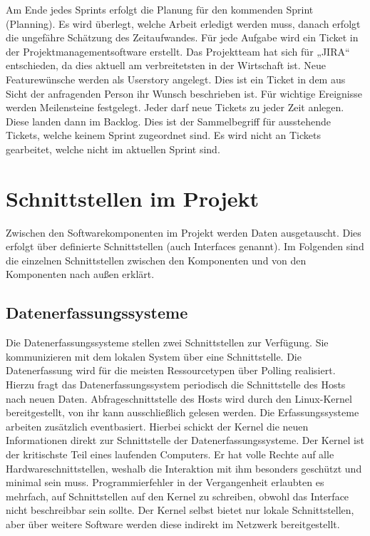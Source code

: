 {Am Ende jedes Sprints erfolgt die Planung für den kommenden Sprint (Planning).
Es wird überlegt, welche Arbeit erledigt werden muss, danach erfolgt die
ungefähre Schätzung des Zeitaufwandes. Für jede Aufgabe wird ein Ticket in der
Projektmanagementsoftware erstellt. Das Projektteam hat sich für „JIRA“
entschieden, da dies aktuell am verbreitetsten in der Wirtschaft ist. Neue
Featurewünsche werden als Userstory angelegt. Dies ist ein Ticket in dem aus
Sicht der anfragenden Person ihr Wunsch beschrieben ist. Für wichtige
Ereignisse werden Meilensteine festgelegt. Jeder darf neue Tickets zu jeder
Zeit anlegen. Diese landen dann im \gls{Backlog}. Dies ist der Sammelbegriff
für ausstehende Tickets, welche keinem Sprint zugeordnet sind. Es wird nicht an
Tickets gearbeitet, welche nicht im aktuellen Sprint sind.
\tm%

\chapter{Schnittstellen im Projekt}
Zwischen den Softwarekomponenten im Projekt werden Daten ausgetauscht. Dies
erfolgt über definierte Schnittstellen (auch Interfaces genannt). Im Folgenden
sind die einzelnen Schnittstellen zwischen den Komponenten und von den
Komponenten nach außen erklärt.
\tm%

\section{Datenerfassungssysteme}
Die Datenerfassungssysteme stellen zwei Schnittstellen zur Verfügung. Sie
kommunizieren mit dem lokalen System über eine
 Schnittstelle. Die Datenerfassung wird
für die meisten Ressourcetypen über Polling realisiert. Hierzu fragt das
Datenerfassungssystem periodisch die Schnittstelle des Hosts nach neuen Daten.
Abfrageschnittstelle des Hosts wird durch den Linux\hyp{}Kernel bereitgestellt,
von ihr kann ausschließlich gelesen werden. Die Erfassungssysteme arbeiten
zusätzlich eventbasiert. Hierbei schickt der Kernel die neuen Informationen
direkt zur Schnittstelle der Datenerfassungssysteme. Der Kernel ist der
kritischste Teil eines laufenden Computers. Er hat volle Rechte auf alle
Hardwareschnittstellen, weshalb die Interaktion mit ihm besonders geschützt und
minimal sein muss. Programmierfehler in der Vergangenheit erlaubten es
mehrfach, auf Schnittstellen auf den Kernel zu schreiben, obwohl das Interface
nicht beschreibbar sein sollte. Der Kernel selbst bietet nur lokale
Schnittstellen, aber über weitere Software werden diese indirekt im Netzwerk
bereitgestellt.

}
